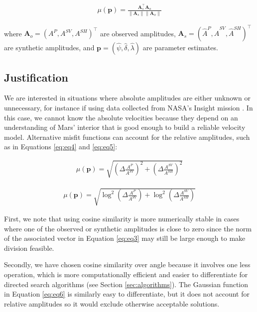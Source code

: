 \documentclass[preprint]{seismica}
\begin{document}
     \begin{align} \label{eq:eq3}
         \mu(\mathbf{p}) = \frac{\mathbf{A}_s^\top\mathbf{A}_o}{\|\mathbf{A}_s\|\|\mathbf{A}_o\|}
     \end{align}

     where $\mathbf{A}_o = (A^P, A^{SV}, A^{SH})^\top$ are observed amplitudes, $\mathbf{A}_s =
     (\widehat{A}^P, \widehat{A}^{SV}, \widehat{A}^{SH})^\top$ are synthetic amplitudes, and
     $\mathbf{p} = (\widehat{\psi}, \widehat{\delta}, \widehat{\lambda})$ are parameter estimates.

     \subsection{Justification}
     We are interested in situations where absolute amplitudes are either unknown or unnecessary, for
     instance if using data collected from NASA's Insight mission \citep{sita_potential_2022}.
     In this case, we cannot know the absolute velocities because they depend on an understanding of
     Mars' interior that is good enough to build a reliable velocity model. Alternative misfit
     functions can account for the relative amplitudes, such as in Equations \ref{eq:eq4} and
     \ref{eq:eq5}:

     \begin{align} \label{eq:eq4}
         \mu(\mathbf{p}) = \sqrt{\left( \Delta \frac{A^{P}}{A^{SV}}\right)^2 + \left( \Delta \frac{A^{SV}}{A^{SH}}\right)^2}
     \end{align}

     \begin{align} \label{eq:eq5}
         \mu(\mathbf{p}) = \sqrt{\log^2 \left( \Delta \frac{A^P}{A^{SV}} \right) + \log^2 \left( \Delta \frac{A^{SV}}{A^{SH}} \right)}
     \end{align}

     First, we note that using cosine similarity is more numerically stable in cases where one of the
     observed or synthetic amplitudes is close to zero since the norm of the associated vector in
     Equation \ref{eq:eq3} may still be large enough to make division feasible.

     Secondly, we have chosen cosine similarity over angle because it involves one less operation,
     which is more computationally efficient and easier to differentiate for directed search
     algorithms (see Section \ref{sec:algorithms}). The Gaussian function in Equation \ref{eq:eq6} is
     similarly easy to differentiate, but it does not account for relative amplitudes so it would
     exclude otherwise acceptable solutions.
\end{document}
